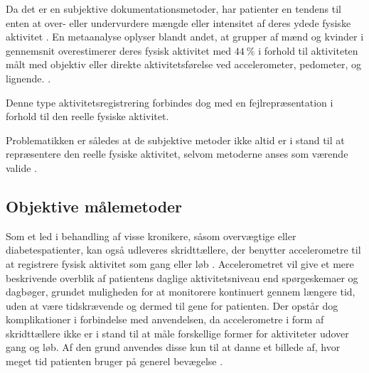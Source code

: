 Da det er en subjektive dokumentationsmetoder, har patienter en tendens til enten at over- eller undervurdere mængde eller intensitet af deres ydede fysiske aktivitet \citep{adamo2009}. 
En metaanalyse oplyser blandt andet, at grupper af mænd og kvinder i gennemsnit overestimerer deres fysisk aktivitet med $44~\%$ i forhold til aktiviteten målt med objektiv eller direkte aktivitetsførelse  ved accelerometer, pedometer, og lignende. \citep{prince2008}.

Denne type aktivitetsregistrering forbindes dog med en fejlrepræsentation i forhold til den reelle fysiske aktivitet. 

Problematikken er således at de subjektive metoder ikke altid er i stand til at repræsentere den reelle fysiske aktivitet, selvom metoderne anses som værende valide \citep{pedersen2011, motionsraad2007}. 

\subsection{Objektive målemetoder}

Som et led i behandling af visse kronikere, såsom overvægtige eller diabetespatienter, kan også udleveres skridttællere, der benytter accelerometre til at registrere fysisk aktivitet som gang eller løb \citep{muller2009, jensen2012, snorgaard2010}. 
Accelerometret vil give et mere beskrivende overblik af patientens daglige aktivitetsniveau end spørgeskemaer og dagbøger, grundet muligheden for at monitorere kontinuert gennem længere tid, uden at være tidskrævende og dermed til gene for patienten. 
Der opstår dog komplikationer i forbindelse med anvendelsen, da accelerometre i form af skridttællere ikke er i stand til at måle forskellige former for aktiviteter udover gang og løb. 
Af den grund anvendes disse kun til at danne et billede af, hvor meget tid patienten bruger på generel bevægelse  \citep{motionsraad2007}.